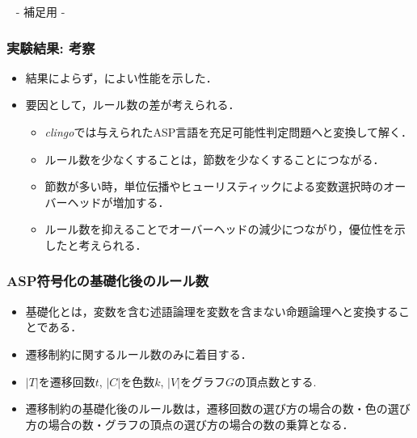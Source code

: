 \appendix
\backupbegin

\begin{frame}{~}
 \centering
 - 補足用 -
\end{frame} 

\begin{frame}\frametitle{実験結果: 考察}

  \begin{itemize}
    \item 結果によらず，によい性能を示した．
    \item 要因として，\alert{ルール数の差}が考えられる．
    \begin{itemize}
      \item \textit{clingo}では与えられたASP言語を充足可能性判定問題へと変換して解く．
      \item ルール数を少なくすることは，節数を少なくすることにつながる．
      \item 節数が多い時，単位伝播やヒューリスティックによる変数選択時のオーバーヘッドが増加する．
      \item ルール数を抑えることでオーバーヘッドの減少につながり，優位性を示したと考えられる．
    \end{itemize}
  \end{itemize}
  
\end{frame}

\begin{frame}\frametitle{ASP符号化の基礎化後のルール数}
  \begin{itemize}
    \item 基礎化とは，変数を含む述語論理を変数を含まない命題論理へと変換することである．
    \item 遷移制約に関するルール数のみに着目する．
    \item $|T|$を遷移回数$t$, $|C|$を色数$k$, $|V|$をグラフ$G$の頂点数とする.
  \end{itemize}


  \begin{itemize}
    \item 遷移制約の基礎化後のルール数は，遷移回数の選び方の場合の数・色の選び方の場合の数・グラフの頂点の選び方の場合の数の乗算となる．
  \end{itemize}
\end{frame}

